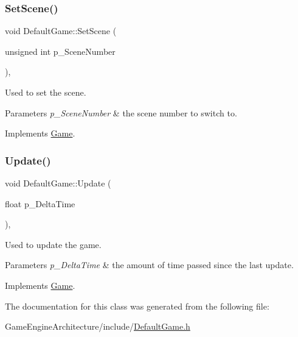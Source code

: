 \subsubsection{\texorpdfstring{SetScene()}{SetScene()}}
{\footnotesize\ttfamily void Default\+Game\+::\+Set\+Scene (\begin{DoxyParamCaption}\item[{unsigned int}]{p\+\_\+\+Scene\+Number }\end{DoxyParamCaption})\hspace{0.3cm}{\ttfamily [override]}, {\ttfamily [virtual]}}



Used to set the scene. 


\begin{DoxyParams}{Parameters}
{\em p\+\_\+\+Scene\+Number} & the scene number to switch to. \\
\hline
\end{DoxyParams}


Implements \mbox{\hyperlink{class_game_a22579e2500d8552e669ef9349480d960}{Game}}.

\mbox{\label{class_default_game_a51e32950165cab20f9ba4e06bfc13e2f}} 
\subsubsection{\texorpdfstring{Update()}{Update()}}
{\footnotesize\ttfamily void Default\+Game\+::\+Update (\begin{DoxyParamCaption}\item[{float}]{p\+\_\+\+Delta\+Time }\end{DoxyParamCaption})\hspace{0.3cm}{\ttfamily [override]}, {\ttfamily [virtual]}}



Used to update the game. 


\begin{DoxyParams}{Parameters}
{\em p\+\_\+\+Delta\+Time} & the amount of time passed since the last update. \\
\hline
\end{DoxyParams}


Implements \mbox{\hyperlink{class_game_ab15084e492f17b36b90314f614b659d3}{Game}}.



The documentation for this class was generated from the following file\+:\begin{DoxyCompactItemize}
\item 
Game\+Engine\+Architecture/include/\mbox{\hyperlink{_default_game_8h}{Default\+Game.\+h}}\end{DoxyCompactItemize}

